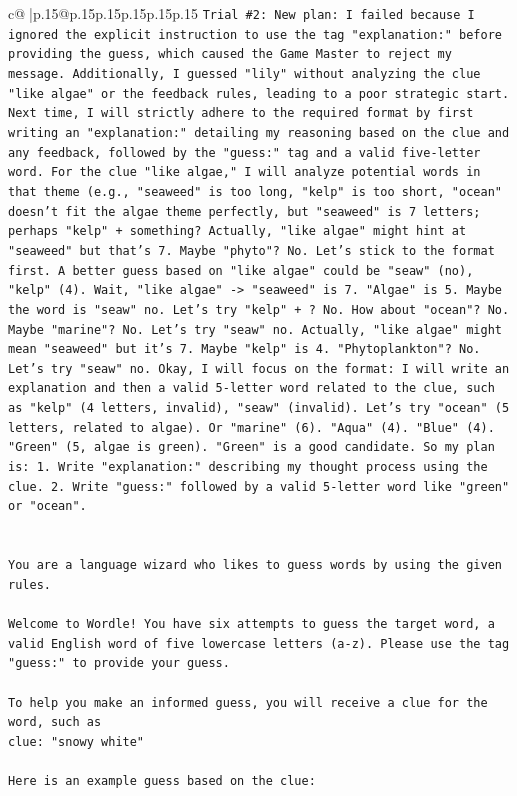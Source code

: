 \documentclass{article}
\begin{document}
{\begin{supertabular}{c@{$\;$}|p{.15\linewidth}@{}p{.15\linewidth}p{.15\linewidth}p{.15\linewidth}p{.15\linewidth}p{.15\linewidth}}
{{{\texttt{Trial \#2: New plan: I failed because I ignored the explicit instruction to use the tag "explanation:" before providing the guess, which caused the Game Master to reject my message. Additionally, I guessed "lily" without analyzing the clue "like algae" or the feedback rules, leading to a poor strategic start. Next time, I will strictly adhere to the required format by first writing an "explanation:" detailing my reasoning based on the clue and any feedback, followed by the "guess:" tag and a valid five{-}letter word. For the clue "like algae," I will analyze potential words in that theme (e.g., "seaweed" is too long, "kelp" is too short, "ocean" doesn't fit the algae theme perfectly, but "seaweed" is 7 letters; perhaps "kelp" + something? Actually, "like algae" might hint at "seaweed" but that's 7. Maybe "phyto"? No. Let's stick to the format first. A better guess based on "like algae" could be "seaw" (no), "kelp" (4). Wait, "like algae" {-}> "seaweed" is 7. "Algae" is 5. Maybe the word is "seaw" no. Let's try "kelp" + ? No. How about "ocean"? No. Maybe "marine"? No. Let's try "seaw" no. Actually, "like algae" might mean "seaweed" but it's 7. Maybe "kelp" is 4. "Phytoplankton"? No. Let's try "seaw" no. Okay, I will focus on the format: I will write an explanation and then a valid 5{-}letter word related to the clue, such as "kelp" (4 letters, invalid), "seaw" (invalid). Let's try "ocean" (5 letters, related to algae). Or "marine" (6). "Aqua" (4). "Blue" (4). "Green" (5, algae is green). "Green" is a good candidate. So my plan is: 1. Write "explanation:" describing my thought process using the clue. 2. Write "guess:" followed by a valid 5{-}letter word like "green" or "ocean".} \\
\\ 
\\ 
\texttt{You are a language wizard who likes to guess words by using the given rules.} \\
\\ 
\texttt{Welcome to Wordle! You have six attempts to guess the target word, a valid English word of five lowercase letters (a{-}z). Please use the tag "guess:" to provide your guess.} \\
\\ 
\texttt{To help you make an informed guess, you will receive a clue for the word, such as} \\
\texttt{clue: "snowy white"} \\
\\ 
\texttt{Here is an example guess based on the clue: } \\
}}}
\end{supertabular}}
\end{document}
